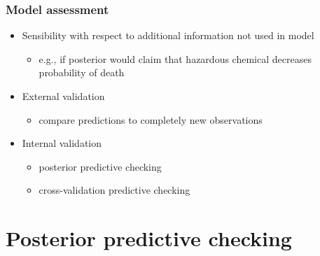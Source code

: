 \documentclass[10pt]{beamer}
\begin{document}
\begin{frame}

\frametitle{Model assessment}

  \begin{itemize}
  \item<+-> Sensibility with respect to additional information not used in model
    \begin{itemize}
    \item e.g., if posterior would claim that hazardous chemical
      decreases probability of death
    \end{itemize}
  \item<+-> External validation
    \begin{itemize}
    \item compare predictions to completely new observations
    \end{itemize}
  \item<+-> Internal validation
    \begin{itemize}
    \item posterior predictive checking
    \item cross-validation predictive checking
    \end{itemize}
  \end{itemize}

\end{frame}

\section{Posterior predictive checking}
\frame{\sectionpage}
\end{document}

